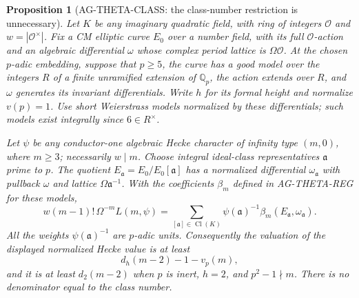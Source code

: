 \documentclass[11pt,a4paper]{article}
\newtheorem{proposition}{Proposition}
\begin{document}
\begin{proposition}[AG-THETA-CLASS: the class-number restriction is unnecessary]
Let $K$ be any imaginary quadratic field, with ring of integers
$\mathcal O$ and $w=|\mathcal O^\times|$. Fix a CM elliptic curve
$E_0$ over a number field, with its full $\mathcal O$-action and an
algebraic differential $\omega$ whose complex period lattice is
$\Omega\mathcal O$. At the chosen $p$-adic embedding, suppose that
$p\ge5$, the curve has a good model over the integers $R$ of a
finite unramified extension of $\mathbb Q_p$, the action extends
over $R$, and $\omega$ generates its invariant differentials.
Write $h$ for its formal height and normalize $v(p)=1$.
Use short Weierstrass models normalized by these differentials;
such models exist integrally since $6\in R^\times$.

Let $\psi$ be any conductor-one algebraic Hecke character of
infinity type $(m,0)$, where $m\ge3$; necessarily $w\mid m$.
Choose integral ideal-class representatives $\mathfrak a$ prime
to $p$. The quotient $E_{\mathfrak a}=E_0/E_0[\mathfrak a]$ has
a normalized differential $\omega_{\mathfrak a}$ with pullback
$\omega$ and lattice $\Omega\mathfrak a^{-1}$. With the
coefficients $\beta_m$ defined in AG-THETA-REG for these models,
\begin{equation}\label{eq:ag-cm-class-sum}
 w(m-1)!\,\Omega^{-m}L(m,\psi)
   =\sum_{[\mathfrak a]\in\operatorname{Cl}(K)}
      \psi(\mathfrak a)^{-1}
      \beta_m(E_{\mathfrak a},\omega_{\mathfrak a}).
\end{equation}
All the weights $\psi(\mathfrak a)^{-1}$ are $p$-adic units.
Consequently the valuation of the displayed normalized Hecke
value is at least
\[
 d_h(m-2)-1-v_p(m),
\]
and it is at least $d_2(m-2)$ when $p$ is inert, $h=2$, and
$p^2-1\nmid m$. There is no denominator equal to the class number.
\end{proposition}
\end{document}
